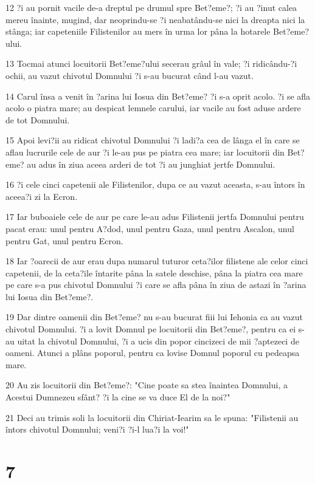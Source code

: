 \par 12 ?i au pornit vacile de-a dreptul pe drumul spre Bet?eme?; ?i au ?inut calea mereu înainte, mugind, dar neoprindu-se ?i neabatându-se nici la dreapta nici la stânga; iar capeteniile Filistenilor au mers în urma lor pâna la hotarele Bet?eme?ului.
\par 13 Tocmai atunci locuitorii Bet?eme?ului secerau grâul în vale; ?i ridicându-?i ochii, au vazut chivotul Domnului ?i s-au bucurat când l-au vazut.
\par 14 Carul însa a venit în ?arina lui Iosua din Bet?eme? ?i s-a oprit acolo. ?i se afla acolo o piatra mare; au despicat lemnele carului, iar vacile au fost aduse ardere de tot Domnului.
\par 15 Apoi levi?ii au ridicat chivotul Domnului ?i ladi?a cea de lânga el în care se aflau lucrurile cele de aur ?i le-au pus pe piatra cea mare; iar locuitorii din Bet?eme? au adus în ziua aceea arderi de tot ?i au junghiat jertfe Domnului.
\par 16 ?i cele cinci capetenii ale Filistenilor, dupa ce au vazut aceasta, s-au întors în aceea?i zi la Ecron.
\par 17 Iar buboaiele cele de aur pe care le-au adus Filistenii jertfa Domnului pentru pacat erau: unul pentru A?dod, unul pentru Gaza, unul pentru Ascalon, unul pentru Gat, unul pentru Ecron.
\par 18 Iar ?oarecii de aur erau dupa numarul tuturor ceta?ilor filistene ale celor cinci capetenii, de la ceta?ile întarite pâna la satele deschise, pâna la piatra cea mare pe care s-a pus chivotul Domnului ?i care se afla pâna în ziua de astazi în ?arina lui Iosua din Bet?eme?.
\par 19 Dar dintre oamenii din Bet?eme? nu s-au bucurat fiii lui Iehonia ca au vazut chivotul Domnului. ?i a lovit Domnul pe locuitorii din Bet?eme?, pentru ca ei s-au uitat la chivotul Domnului, ?i a ucis din popor cincizeci de mii ?aptezeci de oameni. Atunci a plâns poporul, pentru ca lovise Domnul poporul cu pedeapsa mare.
\par 20 Au zis locuitorii din Bet?eme?: "Cine poate sa stea înaintea Domnului, a Acestui Dumnezeu sfânt? ?i la cine se va duce El de la noi?"
\par 21 Deci au trimis soli la locuitorii din Chiriat-Iearim sa le spuna: "Filistenii au întors chivotul Domnului; veni?i ?i-l lua?i la voi!"

\chapter{7}


